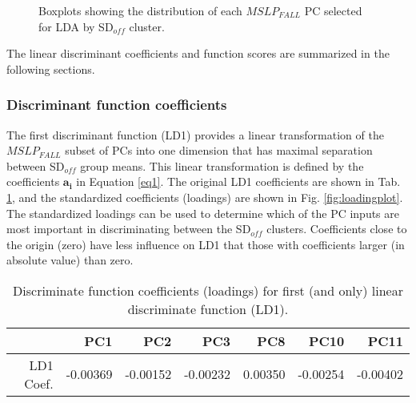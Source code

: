 \documentclass{tATO2e}
\newcommand{\sdoff}{SD$_{off}$}
\begin{document}
\begin{figure}
	\begin{center}
		\hspace{5pt}
		\hspace{5pt}
		\hspace{5pt}
		\hspace{5pt}
		\hspace{5pt}
		\hspace{5pt}
		\caption{Boxplots showing the distribution of each $MSLP_{FALL}$ PC selected for LDA by \sdoff{} cluster.}
		\label{PC_BoxPlt}
	\end{center}
\end{figure}

The linear discriminant coefficients and function scores are summarized in the following sections. 

\subsubsection{Discriminant function coefficients}
The first discriminant function (LD1) provides a linear transformation of the $MSLP_{FALL}$ subset of PCs into one dimension that has maximal separation between \sdoff{} group means. This linear transformation is defined by the coefficients $\bm{a_{i}}$ in Equation \ref{eq1}. The original LD1 coefficients are shown in Tab. \ref{tab:lda_coef}, and the standardized coefficients (loadings) are shown in Fig. \ref{fig:loadingplot}. The standardized loadings can be used to determine which of the PC inputs are most important in discriminating between the \sdoff{} clusters. Coefficients close to the origin (zero) have less influence on LD1 that those with coefficients larger (in absolute value) than zero. 

\begin{table}[ht]
	\centering
	\begin{tabular}{rrrrrrr}
		\hline
		& PC1 & PC2 & PC3 & PC8 & PC10 & PC11 \\ 
		\hline
		LD1 Coef. & -0.00369 & -0.00152 & -0.00232 & 0.00350 & -0.00254 & -0.00402 \\ 
		\hline
	\end{tabular}
	\caption{Discriminate function coefficients (loadings) for first (and only) linear discriminate function (LD1).} 
	\label{tab:lda_coef}
\end{table}
\end{document}

